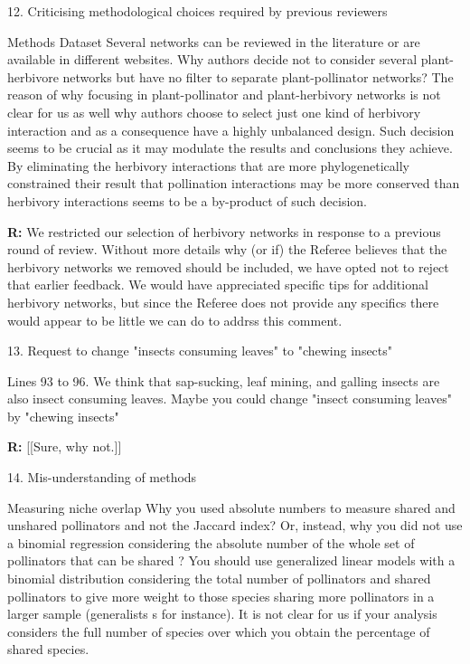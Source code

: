 \documentclass[12pt]{letter}
\newenvironment{refquote}{\bigskip \begin{it}}{\end{it}\smallskip}
\begin{document}
	12. Criticising methodological choices required by previous reviewers

		\begin{refquote}
		Methods
		Dataset
		Several networks can be reviewed in the literature or are available in different websites. Why authors decide not to consider several plant-herbivore networks but have no filter to separate plant-pollinator networks? The reason of why focusing in plant-pollinator and plant-herbivory networks is not clear for us as well why authors choose to select just one kind of herbivory interaction and as a consequence have a highly unbalanced design. Such decision seems to be crucial as it may modulate the results and conclusions they achieve. By eliminating the herbivory interactions that are more phylogenetically constrained their result that pollination interactions may be more conserved than herbivory interactions seems to be a by-product of such decision.
		\end{refquote}


		\textbf{R:} We restricted our selection of herbivory networks in response to a previous round of review. Without more details why (or if) the Referee believes that the herbivory networks we removed should be included, we have opted not to reject that earlier feedback. We would have appreciated specific tips for additional herbivory networks, but since the Referee does not provide any specifics there would appear to be little we can do to addrss this comment.


	13. Request to change "insects consuming leaves" to "chewing insects"

		\begin{refquote}
			Lines 93 to 96. We think that sap-sucking, leaf mining, and galling insects are also insect consuming leaves. Maybe you could change "insect consuming leaves" by "chewing insects"
		\end{refquote}

		\textbf{R:} [[Sure, why not.]]


	14. Mis-understanding of methods

		\begin{refquote}
			Measuring niche overlap
			Why you used absolute numbers to measure shared and unshared pollinators and not the Jaccard index? Or, instead, why you did not use a binomial regression considering the absolute number of the whole set of pollinators that can be shared ? You should use generalized linear models with a binomial distribution considering the total number of pollinators and shared pollinators to give more weight to those species sharing more pollinators in a larger sample (generalists s for instance). It is not clear for us if your analysis considers the full number of species over which you obtain the percentage of shared species.
		\end{refquote}
\end{document}
